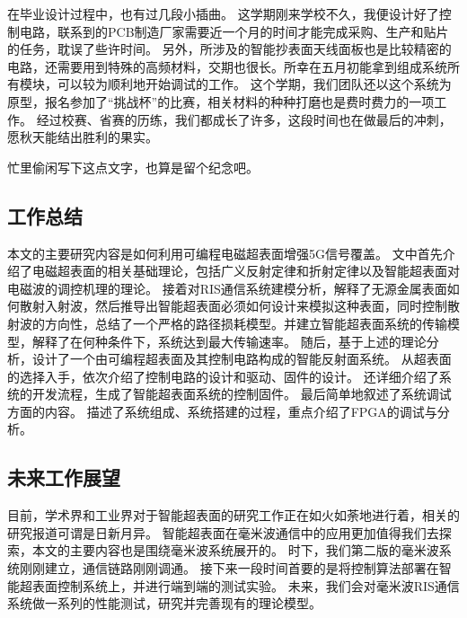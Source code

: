 \documentclass[supercite]{HustGraduPaper}
\begin{document}
在毕业设计过程中，也有过几段小插曲。
这学期刚来学校不久，我便设计好了控制电路，联系到的PCB制造厂家需要近一个月的时间才能完成采购、生产和贴片的任务，耽误了些许时间。
另外，所涉及的智能抄表面天线面板也是比较精密的电路，还需要用到特殊的高频材料，交期也很长。所幸在五月初能拿到组成系统所有模块，可以较为顺利地开始调试的工作。
这个学期，我们团队还以这个系统为原型，报名参加了“挑战杯”的比赛，相关材料的种种打磨也是费时费力的一项工作。
经过校赛、省赛的历练，我们都成长了许多，这段时间也在做最后的冲刺，愿秋天能结出胜利的果实。

忙里偷闲写下这点文字，也算是留个纪念吧。

\subsection{工作总结}

本文的主要研究内容是如何利用可编程电磁超表面增强5G信号覆盖。
文中首先介绍了电磁超表面的相关基础理论，包括广义反射定律和折射定律以及智能超表面对电磁波的调控机理的理论。
接着对RIS通信系统建模分析，解释了无源金属表面如何散射入射波，然后推导出智能超表面必须如何设计来模拟这种表面，同时控制散射波的方向性，总结了一个严格的路径损耗模型。并建立智能超表面系统的传输模型，解释了在何种条件下，系统达到最大传输速率。
随后，基于上述的理论分析，设计了一个由可编程超表面及其控制电路构成的智能反射面系统。
从超表面的选择入手，依次介绍了控制电路的设计和驱动、固件的设计。
还详细介绍了系统的开发流程，生成了智能超表面系统的控制固件。
最后简单地叙述了系统调试方面的内容。
描述了系统组成、系统搭建的过程，重点介绍了FPGA的调试与分析。

\subsection{未来工作展望}

目前，学术界和工业界对于智能超表面的研究工作正在如火如荼地进行着，相关的研究报道可谓是日新月异。
智能超表面在毫米波通信中的应用更加值得我们去探索，本文的主要内容也是围绕毫米波系统展开的。
时下，我们第二版的毫米波系统刚刚建立，通信链路刚刚调通。
接下来一段时间首要的是将控制算法部署在智能超表面控制系统上，并进行端到端的测试实验。
未来，我们会对毫米波RIS通信系统做一系列的性能测试，研究并完善现有的理论模型。
\end{document}
